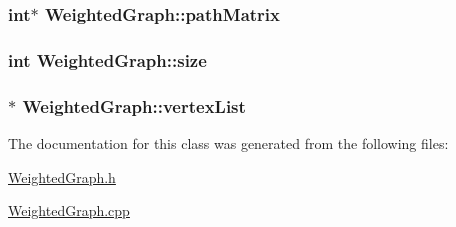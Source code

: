 \hypertarget{class_weighted_graph_ad2e0c787899af85ebf86e9c68431c9aa}{
\subsubsection[{path\-Matrix}]{\setlength{\rightskip}{0pt plus 5cm}int$\ast$ {\bf \-Weighted\-Graph\-::path\-Matrix}}}\label{class_weighted_graph_ad2e0c787899af85ebf86e9c68431c9aa}
\hypertarget{class_weighted_graph_a4452835ad9619580ff968a4d6a9cfe44}{
\subsubsection[{size}]{\setlength{\rightskip}{0pt plus 5cm}int {\bf \-Weighted\-Graph\-::size}}}\label{class_weighted_graph_a4452835ad9619580ff968a4d6a9cfe44}
\hypertarget{class_weighted_graph_a0893fce457ff57820d30fd050777a058}{
\subsubsection[{vertex\-List}]{$\ast$ {\bf \-Weighted\-Graph\-::vertex\-List}}}\label{class_weighted_graph_a0893fce457ff57820d30fd050777a058}


\-The documentation for this class was generated from the following files\-:\begin{DoxyCompactItemize}
\item 
\hyperlink{_weighted_graph_8h}{\-Weighted\-Graph.\-h}\item 
\hyperlink{_weighted_graph_8cpp}{\-Weighted\-Graph.\-cpp}\end{DoxyCompactItemize}

